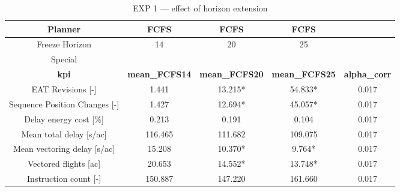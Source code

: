 \begin{table}[htbp]
\caption{EXP 1 — effect of horizon extension}
\begin{center}
\footnotesize
\setlength{\tabcolsep}{3pt}
\renewcommand{\arraystretch}{1.000}
\begin{tabular}{|c|c|c|c|c|}
\hline
Planner & FCFS & FCFS & FCFS &  \\
\hline
Freeze Horizon & 14 & 20 & 25 &  \\
\hline
Special &  &  &  &  \\
\hline
\textbf{kpi} & \textbf{mean\_FCFS14} & \textbf{mean\_FCFS20} & \textbf{mean\_FCFS25} & \textbf{alpha\_corr} \\
\hline
EAT Revisions [-] & 1.441 & 13.215* & 54.833* & 0.017 \\
\hline
Sequence Position Changes [-] & 1.427 & 12.694* & 45.057* & 0.017 \\
\hline
Delay energy cost [\%] & 0.213 & 0.191 & 0.104 & 0.017 \\
\hline
Mean total delay [s/ac] & 116.465 & 111.682 & 109.075 & 0.017 \\
\hline
Mean vectoring delay [s/ac] & 15.208 & 10.370* & 9.764* & 0.017 \\
\hline
Vectored flights [ac] & 20.653 & 14.552* & 13.748* & 0.017 \\
\hline
Instruction count [-] & 150.887 & 147.220 & 161.660 & 0.017 \\
\hline
\end{tabular}
\label{tab:exp\_1\_effect\_of\_horizon\_extension}
\end{center}
\end{table}